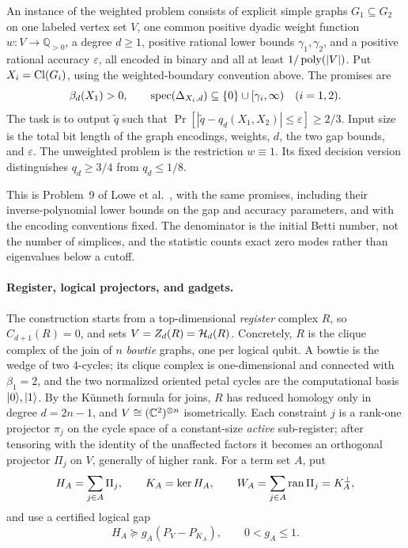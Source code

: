\begin{definition}
\label{def:problem}
An instance of the weighted problem consists of explicit simple graphs
\(G_1\subseteq G_2\) on one labeled vertex set \(V\), one common positive
dyadic weight function \(w:V\to\mathbb Q_{>0}\), a degree \(d\ge1\), positive
rational lower bounds \(\gamma_1,\gamma_2\), and a positive rational accuracy
\(\varepsilon\), all encoded in binary and all at least \(1/\operatorname{poly}(|V|)\).
Put \(X_i=\operatorname{Cl}(G_i)\), using the
weighted-boundary convention above.  The promises are
\[
\beta_d(X_1)>0,
\qquad
\operatorname{spec}(\Delta_{X_i,d})\subseteq\{0\}\cup[\gamma_i,\infty)
\quad(i=1,2).
\]
The task is to output \(\widetilde q\) such that
\(\Pr[|\widetilde q-q_d(X_1,X_2)|\le\varepsilon]\ge2/3\).  Input size is the
total bit length of the graph encodings, weights, \(d\), the two gap bounds,
and \(\varepsilon\).  The unweighted problem is the restriction \(w\equiv1\).
Its fixed decision version distinguishes \(q_d\ge3/4\) from \(q_d\le1/8\).
\end{definition}
This is Problem~9 of Lowe et al.~\cite{lowe2026normalized}, with the same
promises, including their inverse-polynomial lower bounds on the gap and
accuracy parameters, and with the encoding conventions fixed.  The denominator is the
initial Betti number, not the number of simplices, and the statistic counts
exact zero modes rather than eigenvalues below a cutoff.

\paragraph{Register, logical projectors, and gadgets.}
The construction starts from a top-dimensional \emph{register} complex
\(R\), so \(C_{d+1}(R)=0\), and sets \(V=Z_d(R)=\mathcal{H}_d(R)\).  Concretely,
\(R\) is the clique complex of the join of \(n\) \emph{bowtie} graphs, one
per logical qubit.  A bowtie is the wedge of two \(4\)-cycles; its clique
complex is one-dimensional and connected with \(\beta_1=2\), and the two
normalized oriented petal cycles are the computational basis
\(\lvert 0\rangle,\lvert 1\rangle\).  By the K\"unneth formula for joins, \(R\) has reduced
homology only in degree \(d=2n-1\), and \(V\cong(\mathbb{C}^2)^{\otimes n}\)
isometrically.  Each constraint \(j\) is a rank-one projector \(\pi_j\) on
the cycle space of a constant-size \emph{active} sub-register; after
tensoring with the identity of the unaffected factors it becomes an
orthogonal projector \(\Pi_j\) on \(V\), generally of higher rank.  For a
term set \(A\), put
\begin{equation}
\label{eq:logical-sum}
H_A=\sum_{j\in A}\Pi_j,\qquad
K_A=\ker H_A,\qquad
W_A=\sum_{j\in A}\operatorname{ran}\Pi_j=K_A^\perp ,
\end{equation}
and use a certified logical gap
\begin{equation}
\label{eq:logical-gap}
H_A\succeq g_A(P_V-P_{K_A}),\qquad 0<g_A\le1.
\end{equation}

